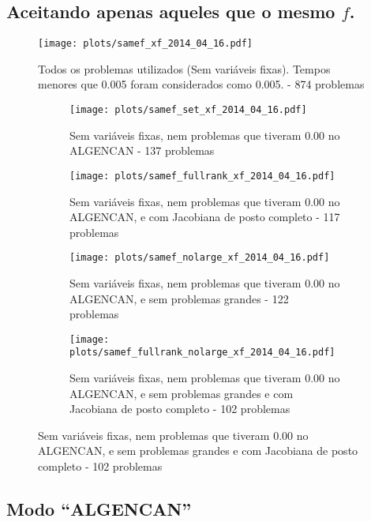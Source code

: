 \documentclass{article}
\begin{document}
\subsection{Aceitando apenas aqueles que o mesmo $f$. }

\begin{figure}[H]
  \centering
  \texttt{[image: plots/samef\_xf\_2014\_04\_16.pdf]}
  \caption{Todos os problemas utilizados (Sem variáveis fixas). Tempos menores
    que 0.005 foram considerados como 0.005. - 874 problemas}
\end{figure}
\begin{figure}[H]
  \centering
  \begin{subfigure}{0.48\textwidth}
    \texttt{[image: plots/samef\_set\_xf\_2014\_04\_16.pdf]}
    \caption{Sem variáveis fixas, nem problemas
      que tiveram 0.00 no ALGENCAN - 137 problemas}
  \end{subfigure}
  \begin{subfigure}{0.48\textwidth}
    \texttt{[image: plots/samef\_fullrank\_xf\_2014\_04\_16.pdf]}
    \caption{Sem variáveis fixas, nem problemas
      que tiveram 0.00 no ALGENCAN, e com Jacobiana de posto completo - 117
      problemas}
  \end{subfigure}
  \begin{subfigure}{0.48\textwidth}
    \texttt{[image: plots/samef\_nolarge\_xf\_2014\_04\_16.pdf]}
    \caption{Sem variáveis fixas, nem problemas
      que tiveram 0.00 no ALGENCAN, e sem problemas grandes - 122 problemas}
  \end{subfigure}
  \begin{subfigure}{0.48\textwidth}
    \texttt{[image: plots/samef\_fullrank\_nolarge\_xf\_2014\_04\_16.pdf]}
    \caption{Sem variáveis fixas, nem problemas
      que tiveram 0.00 no ALGENCAN, e sem problemas grandes e com Jacobiana de
      posto completo - 102 problemas}
  \end{subfigure}
\end{figure}

\subsection{Modo ``ALGENCAN''}
\end{document}
